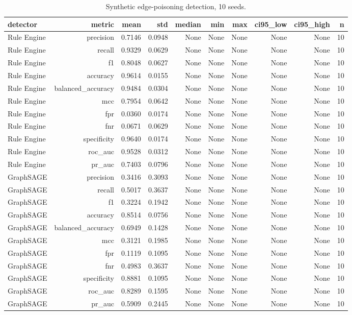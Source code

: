 \begin{table}[htbp]
\centering
\caption{Synthetic edge-poisoning detection, 10 seeds.}
\label{tab:synthetic}
\begin{tabular}{lrrrrrrrrr}
\hline
detector & metric & mean & std & median & min & max & ci95_low & ci95_high & n \\
\hline
Rule Engine & precision & 0.7146 & 0.0948 & None & None & None & None & None & 10 \\
Rule Engine & recall & 0.9329 & 0.0629 & None & None & None & None & None & 10 \\
Rule Engine & f1 & 0.8048 & 0.0627 & None & None & None & None & None & 10 \\
Rule Engine & accuracy & 0.9614 & 0.0155 & None & None & None & None & None & 10 \\
Rule Engine & balanced_accuracy & 0.9484 & 0.0304 & None & None & None & None & None & 10 \\
Rule Engine & mcc & 0.7954 & 0.0642 & None & None & None & None & None & 10 \\
Rule Engine & fpr & 0.0360 & 0.0174 & None & None & None & None & None & 10 \\
Rule Engine & fnr & 0.0671 & 0.0629 & None & None & None & None & None & 10 \\
Rule Engine & specificity & 0.9640 & 0.0174 & None & None & None & None & None & 10 \\
Rule Engine & roc_auc & 0.9528 & 0.0312 & None & None & None & None & None & 10 \\
Rule Engine & pr_auc & 0.7403 & 0.0796 & None & None & None & None & None & 10 \\
GraphSAGE & precision & 0.3416 & 0.3093 & None & None & None & None & None & 10 \\
GraphSAGE & recall & 0.5017 & 0.3637 & None & None & None & None & None & 10 \\
GraphSAGE & f1 & 0.3224 & 0.1942 & None & None & None & None & None & 10 \\
GraphSAGE & accuracy & 0.8514 & 0.0756 & None & None & None & None & None & 10 \\
GraphSAGE & balanced_accuracy & 0.6949 & 0.1428 & None & None & None & None & None & 10 \\
GraphSAGE & mcc & 0.3121 & 0.1985 & None & None & None & None & None & 10 \\
GraphSAGE & fpr & 0.1119 & 0.1095 & None & None & None & None & None & 10 \\
GraphSAGE & fnr & 0.4983 & 0.3637 & None & None & None & None & None & 10 \\
GraphSAGE & specificity & 0.8881 & 0.1095 & None & None & None & None & None & 10 \\
GraphSAGE & roc_auc & 0.8289 & 0.1595 & None & None & None & None & None & 10 \\
GraphSAGE & pr_auc & 0.5909 & 0.2445 & None & None & None & None & None & 10 \\
\hline
\end{tabular}
\end{table}